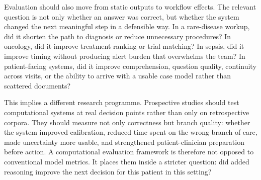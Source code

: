 \documentclass[11pt]{article}
\begin{document}
Evaluation should also move from static outputs to workflow effects. The relevant question is not only whether an answer was correct, but whether the system changed the next meaningful step in a defensible way. In a rare-disease workup, did it shorten the path to diagnosis or reduce unnecessary procedures? In oncology, did it improve treatment ranking or trial matching? In sepsis, did it improve timing without producing alert burden that overwhelms the team? In patient-facing systems, did it improve comprehension, question quality, continuity across visits, or the ability to arrive with a usable case model rather than scattered documents?

This implies a different research programme. Prospective studies should test computational systems at real decision points rather than only on retrospective corpora. They should measure not only correctness but branch quality: whether the system improved calibration, reduced time spent on the wrong branch of care, made uncertainty more usable, and strengthened patient-clinician preparation before action. A computational evaluation framework is therefore not opposed to conventional model metrics. It places them inside a stricter question: did added reasoning improve the next decision for this patient in this setting?
\end{document}
